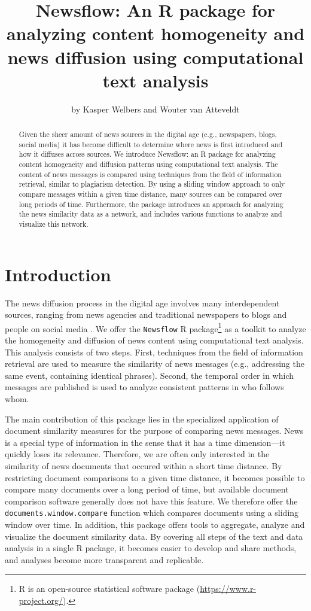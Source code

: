 \documentclass[]{article}
\title{Newsflow: An R package for analyzing content homogeneity and news
diffusion using computational text analysis}
\author{by Kasper Welbers and Wouter van Atteveldt}
\date{}
\let\rmarkdownfootnote\footnote%
\def\footnote{\protect\rmarkdownfootnote}
\begin{document}
\maketitle

\begin{abstract}
Given the sheer amount of news sources in the digital age (e.g.,
newspapers, blogs, social media) it has become difficult to determine
where news is first introduced and how it diffuses across sources. We
introduce Newsflow: an R package for analyzing content homogeneity and
diffusion patterns using computational text analysis. The content of
news messages is compared using techniques from the field of information
retrieval, similar to plagiarism detection. By using a sliding window
approach to only compare messages within a given time distance, many
sources can be compared over long periods of time. Furthermore, the
package introduces an approach for analyzing the news similarity data as
a network, and includes various functions to analyze and visualize this
network.
\end{abstract}

\section{Introduction}\label{introduction}

The news diffusion process in the digital age involves many
interdependent sources, ranging from news agencies and traditional
newspapers to blogs and people on social media
\citep{meraz11, paterson05, pew10}. We offer the \texttt{Newsflow} R
package\footnote{R is an open-source statistical software package
  (\url{https://www.r-project.org/}).} as a toolkit to analyze the
homogeneity and diffusion of news content using computational text
analysis. This analysis consists of two steps. First, techniques from
the field of information retrieval are used to measure the similarity of
news messages (e.g., addressing the same event, containing identical
phrases). Second, the temporal order in which messages are published is
used to analyze consistent patterns in who follows whom.

The main contribution of this package lies in the specialized
application of document similarity measures for the purpose of comparing
news messages. News is a special type of information in the sense that
it has a time dimension---it quickly loses its relevance. Therefore, we
are often only interested in the similarity of news documents that
occured within a short time distance. By restricting document
comparisons to a given time distance, it becomes possible to compare
many documents over a long period of time, but available document
comparison software generally does not have this feature. We therefore
offer the \texttt{documents.window.compare} function which compares
documents using a sliding window over time. In addition, this package
offers tools to aggregate, analyze and visualize the document similarity
data. By covering all steps of the text and data analysis in a single R
package, it becomes easier to develop and share methods, and analyses
become more transparent and replicable.
\end{document}
